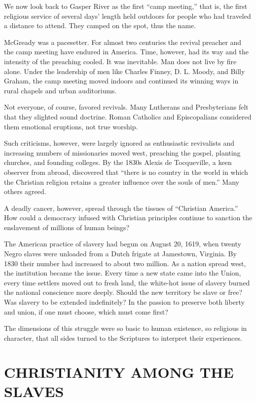 We now look back to Gasper River as the first “camp meeting,” that is, the first religious service
of several days’ length held outdoors for people who had traveled a distance to attend. They camped
on the spot, thus the name.

McGready was a pacesetter. For almost two centuries the revival preacher and the camp meeting have
endured in America. Time, however, had its way and the intensity of the preaching cooled. It was
inevitable. Man does not live by fire alone. Under the leadership of men like Charles Finney, D. L.
Moody, and Billy Graham, the camp meeting moved indoors and continued its winning ways in rural
chapels and urban auditoriums.

Not everyone, of course, favored revivals. Many Lutherans and Presbyterians felt that they slighted
sound doctrine. Roman Catholics and Episcopalians considered them emotional eruptions, not true
worship.

Such criticisms, however, were largely ignored as enthusiastic revivalists and increasing numbers of
missionaries moved west, preaching the gospel, planting churches, and founding colleges. By the
1830s Alexis de Tocqueville, a keen observer from abroad, discovered that “there is no country in
the world in which the Christian religion retains a greater influence over the souls of men.” Many
others agreed.

A deadly cancer, however, spread through the tissues of “Christian America.” How could a democracy
infused with Christian principles continue to sanction the enslavement of millions of human beings?

The American practice of slavery had begun on August 20, 1619, when twenty Negro slaves were
unloaded from a Dutch frigate at Jamestown, Virginia. By 1830 their number had increased to about
two million. As a nation spread west, the institution became the issue. Every time a new state came
into the Union, every time settlers moved out to fresh land, the white-hot issue of slavery burned
the national conscience more deeply. Should the new territory be slave or free? Was slavery to be
extended indefinitely? In the passion to preserve both liberty and union, if one must choose, which
must come first?

The dimensions of this struggle were so basic to human existence, so religious in character, that
all sides turned to the Scriptures to interpret their experiences.

\section{CHRISTIANITY AMONG THE SLAVES}

